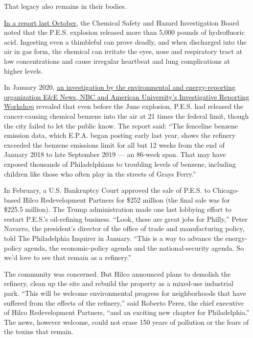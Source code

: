That legacy also remains in their bodies.

\href{https://www.phila.gov/media/20191202091559/refineryreport12219.pdf}{In
a report last October,} the Chemical Safety and Hazard Investigation
Board noted that the P.E.S. explosion released more than 5,000 pounds of
hydrofluoric acid. Ingesting even a thimbleful can prove deadly, and
when discharged into the air in gas form, the chemical can irritate the
eyes, nose and respiratory tract at low concentrations and cause
irregular heartbeat and lung complications at higher levels.

In January 2020,
\href{https://www.nbcnews.com/science/environment/massive-oil-refinery-leaks-toxic-chemical-middle-philadelphia-n1115336}{an
investigation by the environmental and energy-reporting organization
E\&E News, NBC and American University's Investigative Reporting
Workshop} revealed that even before the June explosion, P.E.S. had
released the cancer-causing chemical benzene into the air at 21 times
the federal limit, though the city failed to let the public know. The
report said: ``The fenceline benzene emission data, which E.P.A. began
posting early last year, shows the refinery exceeded the benzene
emissions limit for all but 12 weeks from the end of January 2018 to
late September 2019 --- an 86-week span. That may have exposed thousands
of Philadelphians to troubling levels of benzene, including children
like those who often play in the streets of Grays Ferry.''

In February, a U.S. Bankruptcy Court approved the sale of P.E.S. to
Chicago-based Hilco Redevelopment Partners for \$252 million (the final
sale was for \$225.5 million). The Trump administration made one last
lobbying effort to restart P.E.S.'s oil-refining business. ``Look, these
are great jobs for Philly,'' Peter Navarro, the president's director of
the office of trade and manufacturing policy, told The Philadelphia
Inquirer in January. ``This is a way to advance the energy-policy
agenda, the economic-policy agenda and the national-security agenda. So
we'd love to see that remain as a refinery.''

The community was concerned. But Hilco announced plans to demolish the
refinery, clean up the site and rebuild the property as a mixed-use
industrial park. ``This will be welcome environmental progress for
neighborhoods that have suffered from the effects of the refinery,''
said Roberto Perez, the chief executive of Hilco Redevelopment Partners,
``and an exciting new chapter for Philadelphia.'' The news, however
welcome, could not erase 150 years of pollution or the fears of the
toxins that remain.

